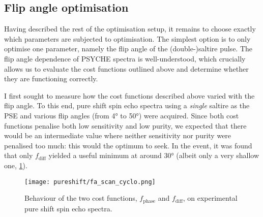 \subsection{Flip angle optimisation}
\label{subsec:pureshift__faopt}

Having described the rest of the optimisation setup, it remains to choose exactly which parameters are subjected to optimisation.
The simplest option is to only optimise one parameter, namely the flip angle of the (double-)saltire pulse.
The flip angle dependence of PSYCHE spectra is well-understood, which crucially allows us to evaluate the cost functions outlined above and determine whether they are functioning correctly.

I first sought to measure how the cost functions described above varied with the flip angle.
To this end, pure shift spin echo spectra using a \textit{single} saltire as the PSE and various flip angles (from \ang{4} to \ang{50}) were acquired.
Since both cost functions penalise both low sensitivity and low purity, we expected that there would be an intermediate value where neither sensitivity nor purity were penalised too much: this would the optimum to seek.
In the event, it was found that only $f_\text{diff}$ yielded a useful minimum at around \ang{30} (albeit only a very shallow one, \cref{fig:fa_scan_cyclo}).

\begin{figure}[htb]
    \centering
    \texttt{[image: pureshift/fa\_scan\_cyclo.png]}
    \caption[Behaviour of $f_\text{phase}$ and $f_\text{diff}$ on experimental pure shift spin echo spectra.]{
        Behaviour of the two cost functions, $f_\text{phase}$ and $f_\text{diff}$, on experimental pure shift spin echo spectra.
    }
    \label{fig:fa_scan_cyclo}
\end{figure}

